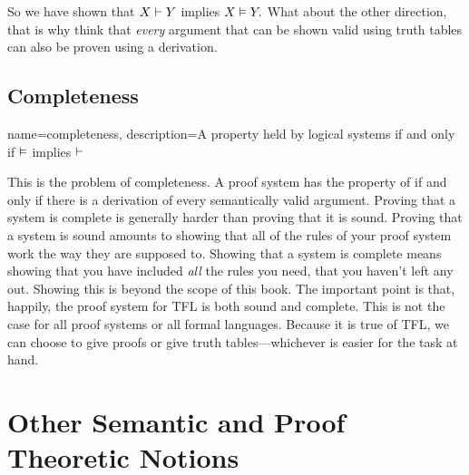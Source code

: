 So we have shown that $X \vdash  Y$ implies $X \vDash Y.$ What about the other direction, that is why think that \emph{every} argument that can be shown valid using truth tables can also be proven using a derivation.

\subsection{Completeness}
{
name=completeness,
description={A property held by logical systems if and only if $\vDash $ implies $\vdash $}
}

This is the problem of completeness. A proof system has the property of   \label{def:completeness} if and only if there is a derivation of every semantically valid argument. Proving that a system is complete is generally harder than proving that it is sound. Proving that a system is sound amounts to showing that all of the rules of your proof system work the way they are supposed to. Showing that a system is complete means showing that you have included \emph{all} the rules you need, that you haven't left any out. Showing this is beyond the scope of this book. The important point is that, happily, the proof system for TFL is both sound and complete. This is not the case for all proof systems or all formal languages. Because it is true of TFL, we can choose to give proofs or give truth tables---whichever is easier for the task at hand.


\section{Other Semantic and Proof Theoretic Notions}

%


